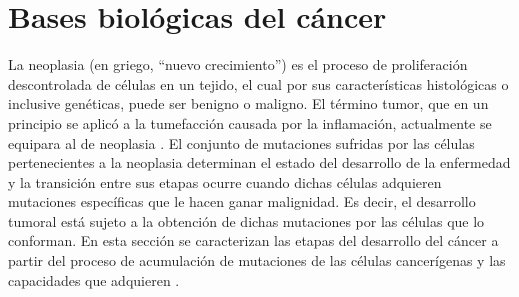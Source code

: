 \chapter{Bases biol\'ogicas del c\'ancer}\label{chapter:proposal}

\hspace{.1cm}La neoplasia (en griego, ``nuevo crecimiento'') es el proceso de proliferación descontrolada de células en un tejido, el cual por sus características histológicas o inclusive genéticas, puede ser benigno o maligno. El término tumor, que en un principio se aplicó a la tumefacción causada por la inflamación, actualmente se equipara al de neoplasia \cite{robins}. El conjunto de mutaciones sufridas por las células pertenecientes a la neoplasia determinan el estado del desarrollo de la enfermedad y la transición entre sus etapas ocurre cuando dichas células adquieren mutaciones específicas que le hacen ganar malignidad. Es decir, el desarrollo tumoral está sujeto a la obtención de dichas mutaciones por las células que lo conforman. En esta sección se caracterizan las etapas del desarrollo del cáncer a partir del proceso de acumulación de mutaciones de las células cancerígenas y las capacidades que adquieren \cite{viabarre2019}.

